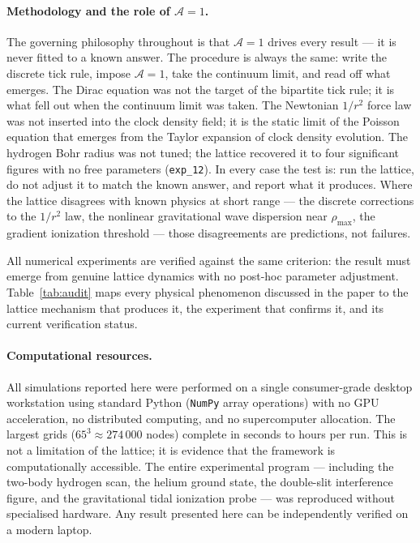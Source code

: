 \paragraph{Methodology and the role of $\mathcal{A}=1$.}
The governing philosophy throughout is that $\mathcal{A}=1$ drives every
result --- it is never fitted to a known answer.
The procedure is always the same: write the discrete tick rule, impose
$\mathcal{A}=1$, take the continuum limit, and read off what emerges.
The Dirac equation was not the target of the bipartite tick rule; it is
what fell out when the continuum limit was taken.
The Newtonian $1/r^2$ force law was not inserted into the clock density
field; it is the static limit of the Poisson equation that emerges from
the Taylor expansion of clock density evolution.
The hydrogen Bohr radius was not tuned; the lattice recovered it to four
significant figures with no free parameters (\texttt{exp\_12}).
In every case the test is: run the lattice, do not adjust it to match
the known answer, and report what it produces.
Where the lattice disagrees with known physics at short range --- the
discrete corrections to the $1/r^2$ law, the nonlinear gravitational
wave dispersion near $\rho_\text{max}$, the gradient ionization threshold
--- those disagreements are predictions, not failures.

All numerical experiments are verified against the same criterion:
the result must emerge from genuine lattice dynamics with no post-hoc
parameter adjustment.
Table~\ref{tab:audit} maps every physical phenomenon discussed in the
paper to the lattice mechanism that produces it, the experiment that
confirms it, and its current verification status.

\paragraph{Computational resources.}
All simulations reported here were performed on a single consumer-grade
desktop workstation using standard Python (\texttt{NumPy} array operations)
with no GPU acceleration, no distributed computing, and no supercomputer
allocation.
The largest grids ($65^3 \approx 274\,000$ nodes) complete in seconds to
hours per run.
This is not a limitation of the lattice; it is evidence that the framework
is computationally accessible.
The entire experimental program --- including the two-body hydrogen scan,
the helium ground state, the double-slit interference figure, and the
gravitational tidal ionization probe --- was reproduced without specialised
hardware.
Any result presented here can be independently verified on a modern laptop.

